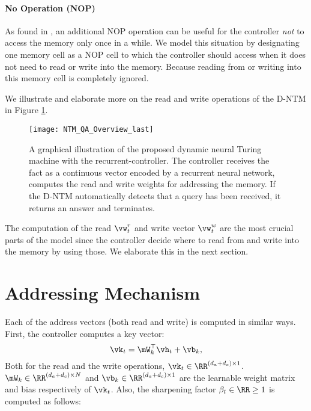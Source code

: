 \documentclass[12pt]{article}
\begin{document}
\paragraph{No Operation (NOP)}

As found in \citep{joulin2015inferring}, an additional NOP operation can be useful
for the controller {\it not} to access the memory only once in a while. We model
this situation by designating one memory cell as a NOP cell to which the controller should
access when it does not need to read or write into the memory. Because reading from or writing
into this memory cell is completely ignored. 

We illustrate and elaborate more on the read and write operations of the D-NTM in Figure \ref{fig_main}.

\begin{figure}[htbp]
\centering
\texttt{[image: NTM\_QA\_Overview\_last]}
\caption{A graphical illustration of the proposed dynamic neural Turing machine with the 
    recurrent-controller.  The controller receives the fact as a
    continuous vector encoded by a recurrent neural network, computes the
    read and write weights for addressing the memory. If the D-NTM automatically
    detects that a query has been received, it returns an answer
    and terminates.}
\label{fig_main}
\end{figure}

The computation of the read $\vw^r_t$ and write vector $\vw^w_t$ are the most crucial parts of the model since the controller decide where to read from and write into the memory by using those. We elaborate this in the next section. 

\section{Addressing Mechanism}

Each of the address vectors (both read and write) is computed in similar
ways. First, the controller computes a key vector:
\[
    \vk_t = \mW^\top_k \vh_t + \vb_k,
\]
Both for the read and the write operations, $\vk_t \in \RR^{(d_a + d_c) \times 1}$. $\mW_k \in \RR^{(d_a+d_c) \times N}$ and $\vb_k \in \RR^{(d_a + d_c) \times 1}$ are the learnable weight matrix and bias respectively of $\vk_t$.  Also, the sharpening factor $\beta_t \in \RR \ge 1$ is computed as follows:
\end{document}

